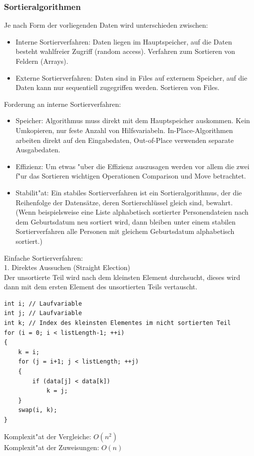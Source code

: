 \subsubsection{Sortieralgorithmen}
Je nach Form der vorliegenden Daten wird unterschieden zwischen: 
\begin{itemize}
\item Interne Sortierverfahren: Daten liegen im Hauptspeicher, auf die Daten besteht wahlfreier Zugriff (random access). Verfahren zum Sortieren von Feldern (Arrays).
\item Externe Sortierverfahren: Daten sind in Files auf externem Speicher, auf die Daten kann nur sequentiell zugegriffen werden. Sortieren von Files. 
\end{itemize}

Forderung an interne Sortierverfahren:\\
\begin{itemize}
\item Speicher: Algorithmus muss direkt mit dem Hauptspeicher auskommen. Kein Umkopieren, nur feste Anzahl von Hilfsvariabeln. In-Place-Algorithmen arbeiten direkt auf den Eingabedaten, Out-of-Place verwenden separate Ausgabedaten.
\item Effizienz: Um etwas "uber die Effizienz auszusagen werden vor allem die zwei f"ur das Sortieren wichtigen Operationen Comparison und Move betrachtet.
\item Stabilit"at: Ein stabiles Sortierverfahren ist ein Sortieralgorithmus, der die Reihenfolge der Datensätze, deren Sortierschlüssel gleich sind, bewahrt. (Wenn beispielsweise eine Liste alphabetisch sortierter Personendateien nach dem Geburtsdatum neu sortiert wird, dann bleiben unter einem stabilen Sortierverfahren alle Personen mit gleichem Geburtsdatum alphabetisch sortiert.)
\end{itemize}

Einfache Sortierverfahren:\\
1. Direktes Aussuchen (Straight Election)\\
Der unsortierte Teil wird nach dem kleinsten Element durchsucht, dieses wird dann mit dem ersten Element des unsortierten Teils vertauscht.\\
\begin{lstlisting}[style=C]
int i; // Laufvariable
int j; // Laufvariable
int k; // Index des kleinsten Elementes im nicht sortierten Teil
for (i = 0; i < listLength-1; ++i)
{
	k = i;
	for (j = i+1; j < listLength; ++j)
	{
		if (data[j] < data[k])
			k = j;
	}
	swap(i, k);
}
\end{lstlisting} 
Komplexit"at der Vergleiche: $O(n^2)$\\
Komplexit"at der Zuweisungen: $O(n)$\\

